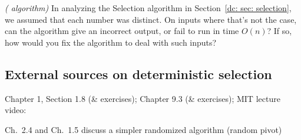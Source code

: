 \exercise\label{dc: exercise: selection} \emph{( algorithm)}
In analyzing the Selection algorithm in Section~\ref{dc: sec: selection},
we assumed that each number was distinct.
On inputs where that's not the case,
can the algorithm give an incorrect output, or fail to run in time $O(n)$?
If so, how would you fix the algorithm to deal with such inputs?
  

\subsection{External sources on deterministic selection}

\begin{mylist}[-]
\item \JE Chapter 1, Section 1.8 (\& exercises); \CLRS Chapter 9.3 (\& exercises);  MIT lecture video:


\item \DPV Ch.~2.4 and \KT Ch.~1.5 discuss a simpler randomized algorithm (random pivot)

\end{mylist}


